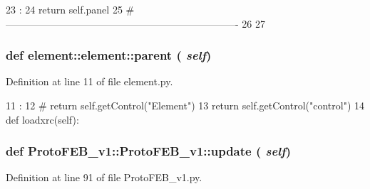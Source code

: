 \begin{DoxyCode}
23                   :
24         return self.panel
25 #----------------------------------------------------------------------
26 
27     
    
\end{DoxyCode}
\hypertarget{classelement_1_1element_a2010faa4da4d94ff8deaaaf74bbc6ba3}{
\subsubsection[{parent}]{\setlength{\rightskip}{0pt plus 5cm}def element::element::parent ( {\em self})}}
\label{classelement_1_1element_a2010faa4da4d94ff8deaaaf74bbc6ba3}


Definition at line 11 of file element.py.


\begin{DoxyCode}
11                     :
12 #        return self.getControl("Element")
13         return self.getControl("control")
14    
    def loadxrc(self):
\end{DoxyCode}
\hypertarget{classProtoFEB__v1_1_1ProtoFEB__v1_a1b2e248189d0cc03eb7666100dbe1280}{
\subsubsection[{update}]{\setlength{\rightskip}{0pt plus 5cm}def ProtoFEB\_\-v1::ProtoFEB\_\-v1::update ( {\em self})}}
\label{classProtoFEB__v1_1_1ProtoFEB__v1_a1b2e248189d0cc03eb7666100dbe1280}


Definition at line 91 of file ProtoFEB\_\-v1.py.


